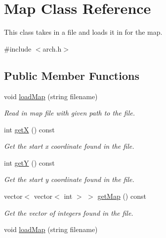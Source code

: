 \hypertarget{classMap}{}\section{Map Class Reference}
\label{classMap}


This class takes in a file and loads it in for the map.  




{\ttfamily \#include $<$arch.\+h$>$}

\subsection*{Public Member Functions}
\begin{DoxyCompactItemize}
\item 
void \hyperlink{classMap_a51e1c9c777bc6c4171707f1528a73dc6}{load\+Map} (string filename)\hypertarget{classMap_a51e1c9c777bc6c4171707f1528a73dc6}{}\label{classMap_a51e1c9c777bc6c4171707f1528a73dc6}

\begin{DoxyCompactList}\small\item\em Read in map file with given path to the file. \end{DoxyCompactList}\item 
int \hyperlink{classMap_ae235f91105c54961e42e2750cf52deaa}{getX} () const \hypertarget{classMap_ae235f91105c54961e42e2750cf52deaa}{}\label{classMap_ae235f91105c54961e42e2750cf52deaa}

\begin{DoxyCompactList}\small\item\em Get the start x coordinate found in the file. \end{DoxyCompactList}\item 
int \hyperlink{classMap_a7d9858d941f8e40226f4a12d4f8437c4}{getY} () const \hypertarget{classMap_a7d9858d941f8e40226f4a12d4f8437c4}{}\label{classMap_a7d9858d941f8e40226f4a12d4f8437c4}

\begin{DoxyCompactList}\small\item\em Get the start y coordinate found in the file. \end{DoxyCompactList}\item 
vector$<$ vector$<$ int $>$ $>$ \hyperlink{classMap_a84b44f93dc09fc770710b84bf070adfe}{get\+Map} () const \hypertarget{classMap_a84b44f93dc09fc770710b84bf070adfe}{}\label{classMap_a84b44f93dc09fc770710b84bf070adfe}

\begin{DoxyCompactList}\small\item\em Get the vector of integers found in the file. \end{DoxyCompactList}\item 
void \hyperlink{classMap_a51e1c9c777bc6c4171707f1528a73dc6}{load\+Map} (string filename)\hypertarget{classMap_a51e1c9c777bc6c4171707f1528a73dc6}{}\label{classMap_a51e1c9c777bc6c4171707f1528a73dc6}


\end{DoxyCompactItemize}

